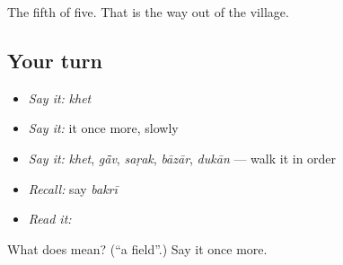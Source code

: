 \begin{grammarlens}[title={What you've built}]
The fifth of five. That is the way out of the village.
\end{grammarlens}

\subsection*{Your turn}
\begin{itemize}
\raggedright
  \item \emph{Say it:} \emph{khet}
  \item \emph{Say it:} it once more, slowly
  \item \emph{Say it:} \emph{khet}, \emph{gā̃v}, \emph{saṛak}, \emph{bāzār}, \emph{dukān} — walk it in order
  \item \emph{Recall:} say \emph{bakrī}
  \item \emph{Read it:} \textbf{}
\end{itemize}

\begin{tcolorbox}[breakable,colback=teal!4,colframe=teal!35!black,title={Before you move on}]
What does  mean? (\textquotedblleft{}a field\textquotedblright{}.) Say it once more.
\end{tcolorbox}
